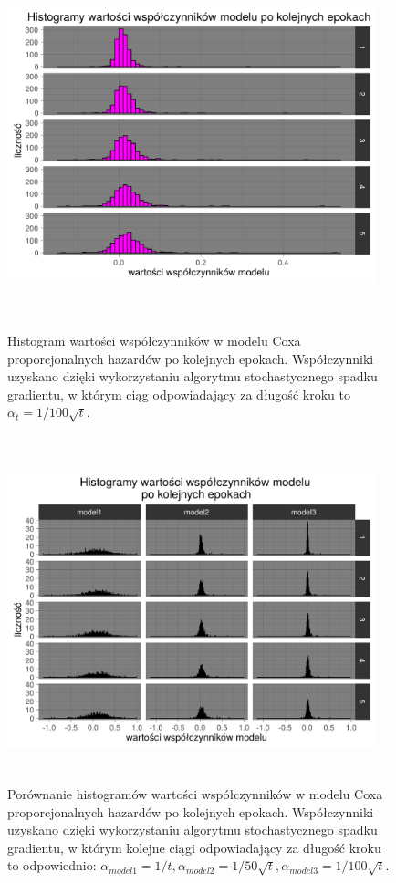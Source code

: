 \begin{figure}[!ht]
\centering
\includegraphics[width=0.95\textwidth, height = 280pt]{Obrazki/analiza/hist_overt_100sqrt_t.pdf}
\caption{\label{fig:hist3} Histogram wartości współczynników w modelu Coxa proporcjonalnych hazardów po kolejnych epokach. Współczynniki uzyskano dzięki wykorzystaniu algorytmu stochastycznego spadku gradientu, w którym ciąg odpowiadający za długość kroku to $\alpha_t = 1/100\sqrt{t}$.}
\ \\
\includegraphics[width=0.95\textwidth, height = 260pt]{Obrazki/analiza/hist_together.pdf}
\caption{\label{fig:hist4} Porównanie histogramów wartości współczynników w modelu Coxa proporcjonalnych hazardów po kolejnych epokach. Współczynniki uzyskano dzięki wykorzystaniu algorytmu stochastycznego spadku gradientu, w którym kolejne ciągi odpowiadający za długość kroku to odpowiednio: $\alpha_{model1} = 1/t, \alpha_{model2} = 1/50\sqrt{t},  \alpha_{model3} = 1/100\sqrt{t}$.}
\end{figure}


